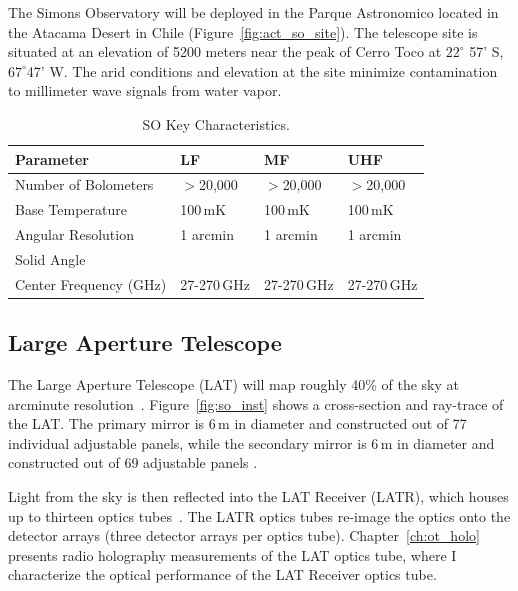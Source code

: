 The Simons Observatory will be deployed in the Parque Astronomico located in the Atacama Desert in Chile (Figure~\ref{fig:act_so_site}). The telescope site is situated at an elevation of 5200 meters near the peak of Cerro Toco at $22 ^\circ$ 57' S, $67^\circ$47' W.  The arid conditions and elevation at the site minimize contamination to millimeter wave signals from water vapor.

\begin{table}[b]
    \centering
    \begin{tabular}{|l|l|l|l|} \hline
        \textbf{ Parameter} &  \textbf{LF} &  \textbf{MF}  &  \textbf{UHF}  \\ \hline \hline
        Number of Bolometers & $>$20,000& $>$20,000& $>$20,000\\\hline
        Base Temperature & 100\,mK & 100\,mK & 100\,mK\\\hline
        Angular Resolution & 1 arcmin &1 arcmin &1 arcmin\\\hline
        Solid Angle & & &\\\hline
        Center Frequency (GHz) & 27-270\,GHz & 27-270\,GHz & 27-270\,GHz\\\hline
    \end{tabular} \caption{SO Key Characteristics.}
    \label{tab:so}
\end{table}

\subsection{Large Aperture Telescope}

The Large Aperture Telescope (LAT) will map roughly 40\% of the sky at arcminute resolution~\cite{xu/etal:2020c}.   Figure~\ref{fig:so_inst} shows a cross-section and ray-trace of the LAT.  The primary mirror is 6\,m in diameter and constructed out of 77 individual adjustable panels, while the secondary mirror is 6\,m in diameter and constructed out of 69 adjustable panels \cite{gali18}.

Light from the sky is then reflected into the LAT Receiver (LATR), which houses up to thirteen optics tubes~\cite{Xu_2021}.  The LATR optics tubes re-image the optics onto the detector arrays (three detector arrays per optics tube).  Chapter~\ref{ch:ot_holo} presents radio holography measurements of the LAT optics tube, where I characterize the optical performance of the LAT Receiver optics tube.

